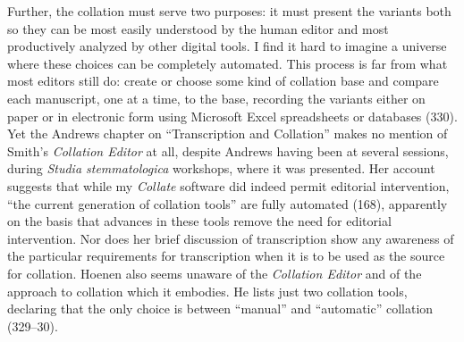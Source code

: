 \begin{review}
Further, the collation must serve two purposes: it must present
the variants both so they can be most easily understood by the human
editor and most productively analyzed by other digital tools. I find it
hard to imagine a universe where these choices can be completely
automated. This process is far from what most editors still do: create
or choose some kind of collation base and compare each manuscript, one
at a time, to the base, recording the variants either on paper or in
electronic form using Microsoft Excel spreadsheets or databases (330).
Yet the Andrews chapter on ``Transcription and Collation'' makes no
mention of Smith's \emph{Collation Editor} at all, despite Andrews
having been at several sessions, during \emph{Studia stemmatologica}
workshops, where it was presented. Her account suggests that while my
\emph{Collate} software did indeed permit editorial intervention, ``the
current generation of collation tools'' are fully automated (168),
apparently on the basis that advances in these tools remove the need for
editorial intervention. Nor does her brief discussion of transcription
show any awareness of the particular requirements for transcription when
it is to be used as the source for collation. Hoenen also seems unaware
of the \emph{Collation Editor} and of the approach to collation which it
embodies. He lists just two collation tools, declaring that the only
choice is between ``manual'' and ``automatic'' collation (329--30).


\end{review}
